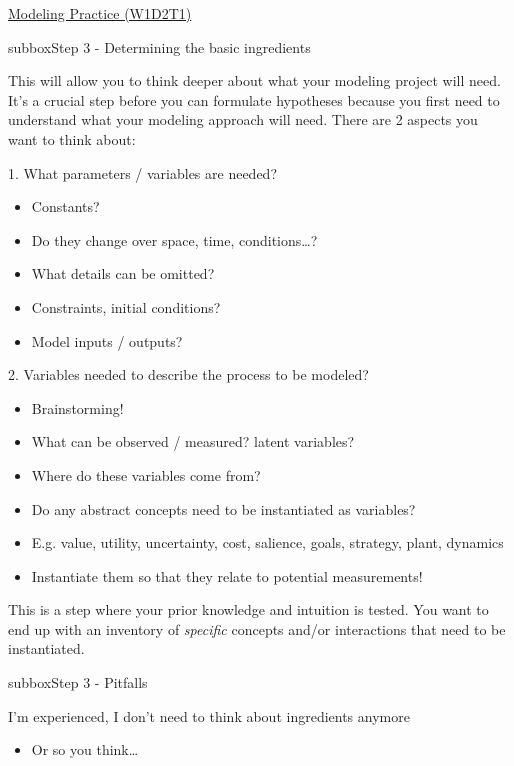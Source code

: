 \begin{textbox}{\href{https://compneuro.neuromatch.io/tutorials/W1D2_ModelingPractice/W1D2_Intro.html}{Modeling Practice  (W1D2T1)} }

\begin{subbox}{subbox}{Step 3 - Determining the basic ingredients }
\scriptsize

This will allow you to think deeper about what your modeling project will need. It's a crucial step before you can formulate hypotheses because you first need to understand what your modeling approach will need. There are 2 aspects you want to think about:



1.   What parameters / variables are needed? 
\begin{itemize}
    \item 
     Constants?
      \item Do they change over space, time, conditions…?
     \item What details can be omitted?
      \item Constraints, initial conditions?
      \item Model inputs / outputs?
      \end{itemize}  
2.   Variables needed to describe the process to be modeled?
\begin{itemize}
     \item Brainstorming!
     \item What can be observed / measured?  latent variables?    
     \item Where do these variables come from?
     \item Do any abstract concepts need to be instantiated as variables?
       \item E.g. value, utility, uncertainty, cost, salience, goals, strategy, plant, dynamics
        \item Instantiate them so that they relate to potential measurements!
\end{itemize}  
This is a step where your prior knowledge and intuition is tested. You want to end up with an inventory of \textit{specific} concepts and/or interactions that need to be instantiated. 

  \end{subbox}
\begin{subbox}{subbox}{Step 3 - Pitfalls }
\scriptsize


I’m experienced, I don’t need to think about ingredients anymore
 \begin{itemize}
    \item Or so you think… \end{itemize} 


\end{subbox}
\end{textbox}
